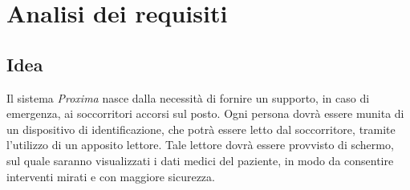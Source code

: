 \documentclass[a4paper,12pt]{report}
\begin{document}
\chapter{Analisi dei requisiti} 
\section{Idea}
Il sistema \emph{Proxima} nasce dalla necessità di fornire un supporto, in caso di emergenza, ai soccorritori accorsi sul posto. Ogni persona dovrà essere munita di un dispositivo di identificazione, che potrà essere letto dal soccorritore, tramite l'utilizzo di un apposito lettore. Tale lettore dovrà essere provvisto di schermo, sul quale saranno visualizzati i dati medici del paziente, in modo da consentire interventi mirati e con maggiore sicurezza. 
\end{document}
